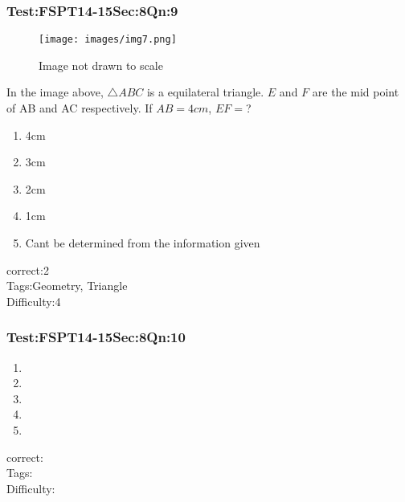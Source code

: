 \documentclass[]{beamer}
\begin{document}
    \begin{frame}
	    \frametitle{Test:FSPT14-15\hspace{2mm}Sec:8\hspace{2mm}Qn:9}
	    \begin{figure}
	    	\begin{center}
	    		\texttt{[image: images/img7.png]}
	    	\end{center}
	    	{Image not drawn to scale}
	    \end{figure}
	    In the image above, $\bigtriangleup ABC$ is a equilateral triangle. $E$ and $F$ are the mid point of AB and AC respectively. If $AB = 4cm$, $EF=$? 
	    \begin{enumerate}
	        \item
	            4cm
	        \item
	           3cm
	        \item
	           2cm
	        \item
	           1cm
	        \item
	            Cant be determined from the information given
	    \end{enumerate}
	    correct:2  \\   
	    Tags:Geometry, Triangle    \\
	    Difficulty:4   \\
    \end{frame}
    \begin{frame}
	    \frametitle{Test:FSPT14-15\hspace{2mm}Sec:8\hspace{2mm}Qn:10}
	    
	    \begin{enumerate}
	        \item
	            
	        \item
	           
	        \item
	           
	        \item
	            
	        \item
	            
	    \end{enumerate}
	    correct:  \\   
	    Tags:    \\
	    Difficulty:   \\
    \end{frame}
\end{document}
